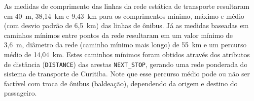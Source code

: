 
        

As medidas de comprimento das linhas da rede estática de transporte resultaram em 40~m, 38,14~km e 9,43~km para os comprimentos mínimo, máximo e médio (com desvio padrão de 6,5~km) das linhas de ônibus. Já as medidas baseadas em caminhos mínimos entre pontos da rede resultaram em um valor mínimo de 3,6~m, diâmetro da rede (caminho mínimo mais longo) de 55~km e um percurso médio de 14,04~km. Estes caminhos mínimos foram obtidos através dos atributos de distância (\texttt{DISTANCE}) das arestas \texttt{NEXT\_STOP}, gerando uma rede ponderada do sistema de transporte de Curitiba. Note que esse percurso médio pode ou não ser factível com troca de ônibus (baldeação), dependendo da origem e destino do passageiro.





